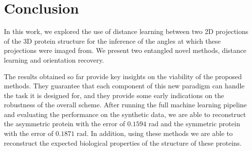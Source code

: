 \section{Conclusion}

 In this work, we explored the use of distance learning between two 2D projections of the 3D protein structure for the inference of the angles at which these projections were imaged from.
We present two entangled novel methods, distance learning and orientation recovery.

The results obtained so far provide key insights on the viability of the proposed methods.
They guarantee that each component of this new paradigm can handle the task it is designed for, and they provide some early indications on the robustness of the overall scheme.
After running the full machine learning pipeline and evaluating the performance on the synthetic data, we are able to reconstruct the asymmetric protein with the error of $0.1594$ rad and the symmetric protein with the error of $0.1871$ rad.
In addition, using these methods we are able to reconstruct the expected biological properties of the structure of these proteins.


